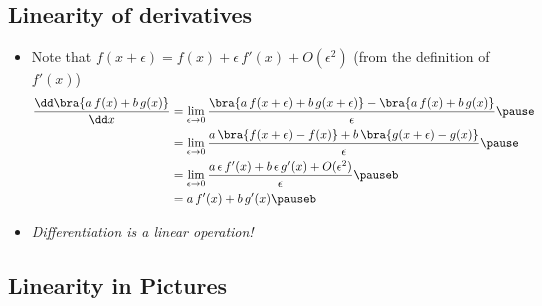 \begin{slide}
\section{Linearity of derivatives}
  
\begin{PauseHighLight}
  \begin{itemize}
  \item Note that $f(x+\epsilon) = f(x) + \epsilon\, f'(x) +
    O(\epsilon^2)$ (from the definition of $f'(x)$)\pause
    \begin{align*}
      \frac{\dd \bra{a\,f(x)+b\,g(x)}}{\dd x}
      &=
      \lim_{\epsilon\rightarrow 0}
      \frac{\bra{a\,f(x+\epsilon)+b\,g(x+\epsilon)}-\bra{a\,f(x)+b\,g(x)}}{\epsilon}
      \pause \\
      &=
      \lim_{\epsilon\rightarrow 0}
      \frac{a\, \bra{f(x+\epsilon)-f(x)} + b\,\bra{g(x+\epsilon)-g(x)}}{\epsilon}
      \pause \\
      &=  \lim_{\epsilon\rightarrow 0}
        \frac{a\,\epsilon\, f'(x) +b\,\epsilon\,g'(x) +
        O(\epsilon^2)}{\epsilon}\pauseb \\
      &= a\,f'(x) + b\,g'(x) \pauseb
    \end{align*}
  \item \emph{Differentiation is a linear operation!}\pauseb
  \end{itemize}
\end{PauseHighLight}

\end{slide}


\begin{slide}
\section[-1]{Linearity in Pictures}

 \pb \pause {}
  \begin{center}
    \pause
  \end{center}

\end{slide}


